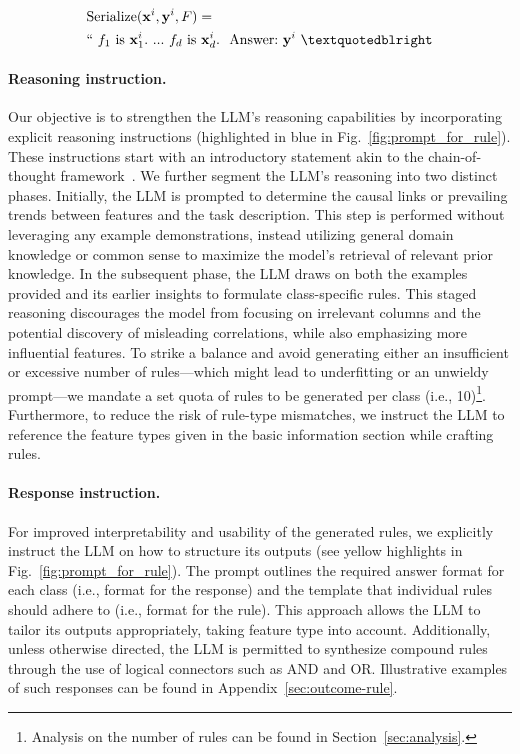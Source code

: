 \begin{align}
&\text{Serialize}(\mathbf{x}^i,\mathbf{y}^i, F) = \nonumber \\ 
&``\ f_1\ \text{is}\ \mathbf{x}^i_1.\ ... \ f_d\  \text{is}\  \mathbf{x}^i_d.\ \ \text{Answer:}\  \mathbf{y}^i\ ”
\end{align}

\vspace*{-0.12in}
\paragraph{Reasoning instruction.} Our objective is to strengthen the LLM’s reasoning capabilities by incorporating explicit reasoning instructions (highlighted in blue in Fig.~\ref{fig:prompt_for_rule}). These instructions start with an introductory statement akin to the chain-of-thought framework~\cite{wei2022chain}. We further segment the LLM’s reasoning into two distinct phases. Initially, the LLM is prompted to determine the causal links or prevailing trends between features and the task description. This step is performed without leveraging any example demonstrations, instead utilizing general domain knowledge or common sense to maximize the model’s retrieval of relevant prior knowledge. In the subsequent phase, the LLM draws on both the examples provided and its earlier insights to formulate class-specific rules. This staged reasoning discourages the model from focusing on irrelevant columns and the potential discovery of misleading correlations, while also emphasizing more influential features. To strike a balance and avoid generating either an insufficient or excessive number of rules—which might lead to underfitting or an unwieldy prompt—we mandate a set quota of rules to be generated per class (i.e., 10)\footnote{Analysis on the number of rules can be found in Section~\ref{sec:analysis}.}. Furthermore, to reduce the risk of rule-type mismatches, we instruct the LLM to reference the feature types given in the basic information section while crafting rules.

\vspace*{-0.12in}
\paragraph{Response instruction.} For improved interpretability and usability of the generated rules, we explicitly instruct the LLM on how to structure its outputs (see yellow highlights in Fig.~\ref{fig:prompt_for_rule}). The prompt outlines the required answer format for each class (i.e., format for the response) and the template that individual rules should adhere to (i.e., format for the rule). This approach allows the LLM to tailor its outputs appropriately, taking feature type into account. Additionally, unless otherwise directed, the LLM is permitted to synthesize compound rules through the use of logical connectors such as AND and OR. Illustrative examples of such responses can be found in Appendix~\ref{sec:outcome-rule}.

